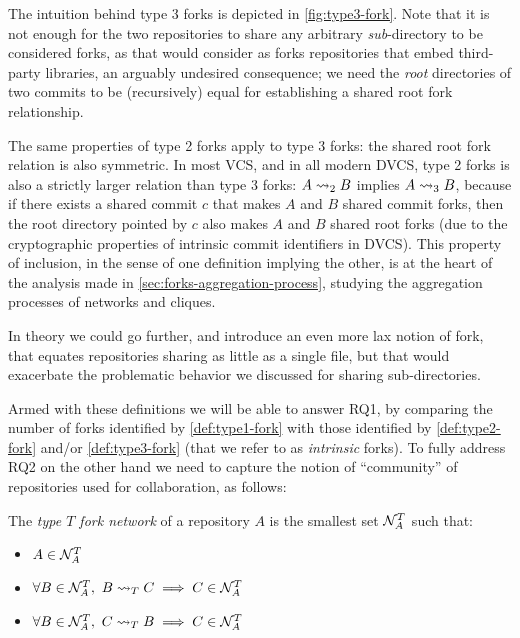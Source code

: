 The intuition behind type 3 forks is depicted in \cref{fig:type3-fork}. Note
that it is not enough for the two repositories to share any arbitrary
\emph{sub}-directory to be considered forks, as that would consider as forks
repositories that embed third-party libraries, an arguably undesired
consequence; we need the \emph{root} directories of two commits to be
(recursively) equal for establishing a shared root fork relationship.

The same properties of type 2 forks apply to type 3 forks: the shared root fork
relation is also symmetric. In most VCS, and in all modern DVCS, type 2 forks
is also a strictly larger relation than type 3 forks: $A\rightsquigarrow_2 B$ implies
$A\rightsquigarrow_3 B$, because if there exists a shared commit $c$ that makes $A$ and
$B$ shared commit forks, then the root directory pointed by $c$ also makes $A$
and $B$ shared root forks (due to the cryptographic properties of intrinsic
commit identifiers in DVCS).
This property of inclusion, in the sense of one definition implying the other,
is at the heart of the analysis made in \cref{sec:forks-aggregation-process},
studying the aggregation processes of networks and cliques.

In theory we could go further, and introduce an even more lax notion of fork,
that equates repositories sharing as little as a single file, but that would
exacerbate the problematic behavior we discussed for sharing sub-directories.

Armed with these definitions we will be able to answer RQ1, by comparing the
number of forks identified by \cref{def:type1-fork} with those
identified by \cref{def:type2-fork} and/or \cref{def:type3-fork}
(that we refer to as {\it intrinsic} forks).
To fully address RQ2 on the other hand we need to capture the notion of
``community'' of repositories used for collaboration, as follows:
\begin{definition}
  \label{def:fork-network}
  The \emph{type $T$ fork network} of a repository $A$ is the smallest set
  $\mathcal{N}^T_A$ such that:
  \begin{itemize}
  \item $A\in\mathcal{N}^T_A$
  \item $\forall B\in\mathcal{N}^T_A,~B\rightsquigarrow_T C \implies C\in\mathcal{N}^T_A$
  \item $\forall B\in\mathcal{N}^T_A,~C\rightsquigarrow_T B \implies C\in\mathcal{N}^T_A$
  \end{itemize}
\end{definition}

